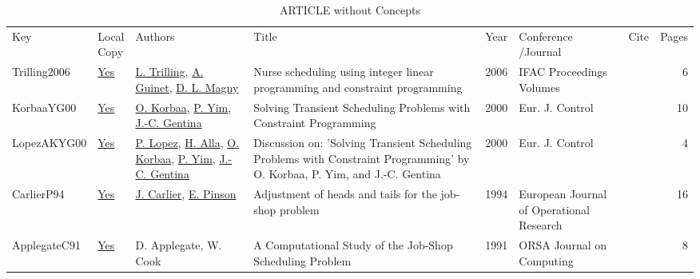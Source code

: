 {\scriptsize
\begin{longtable}{llp{5cm}p{10cm}rp{3cm}lr}
\rowcolor{white}\caption{ARTICLE without Concepts}\\ \toprule
\rowcolor{white}Key & \shortstack{Local\\Copy} & Authors & Title & Year & \shortstack{Conference\\/Journal} & Cite & Pages\\ \midrule
\endhead
\bottomrule
\endfoot
Trilling2006 & \href{../works/Trilling2006.pdf}{Yes} & \hyperref[auth:a1654]{L. Trilling}, \hyperref[auth:a1655]{A. Guinet}, \hyperref[auth:a1656]{D. L. Magny} & Nurse scheduling using integer linear programming and constraint programming & 2006 & IFAC Proceedings Volumes & \cite{Trilling2006} & 6\\KorbaaYG00 & \href{../works/KorbaaYG00.pdf}{Yes} & \hyperref[auth:a679]{O. Korbaa}, \hyperref[auth:a680]{P. Yim}, \hyperref[auth:a681]{J.-C. Gentina} & Solving Transient Scheduling Problems with Constraint Programming & 2000 & Eur. J. Control & \cite{KorbaaYG00} & 10\\LopezAKYG00 & \href{../works/LopezAKYG00.pdf}{Yes} & \hyperref[auth:a3]{P. Lopez}, \hyperref[auth:a682]{H. Alla}, \hyperref[auth:a679]{O. Korbaa}, \hyperref[auth:a680]{P. Yim}, \hyperref[auth:a681]{J.-C. Gentina} & Discussion on: 'Solving Transient Scheduling Problems with Constraint Programming' by O. Korbaa, P. Yim, and {J.-C.} Gentina & 2000 & Eur. J. Control & \cite{LopezAKYG00} & 4\\CarlierP94 & \href{../works/CarlierP94.pdf}{Yes} & \hyperref[auth:a844]{J. Carlier}, \hyperref[auth:a845]{E. Pinson} & Adjustment of heads and tails for the job-shop problem & 1994 & European Journal of Operational Research & \cite{CarlierP94} & 16\\ApplegateC91 & \href{../works/ApplegateC91.pdf}{Yes} & D. Applegate, W. Cook & A Computational Study of the Job-Shop Scheduling Problem & 1991 & ORSA Journal on Computing & \cite{ApplegateC91} & 8\\\end{longtable}
}

